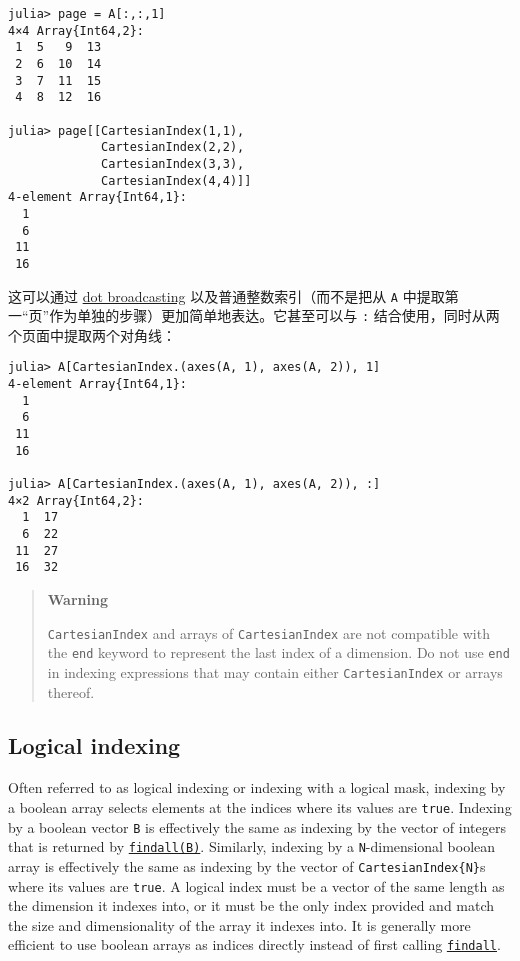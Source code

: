 \begin{verbatim}
julia> page = A[:,:,1]
4×4 Array{Int64,2}:
 1  5   9  13
 2  6  10  14
 3  7  11  15
 4  8  12  16

julia> page[[CartesianIndex(1,1),
             CartesianIndex(2,2),
             CartesianIndex(3,3),
             CartesianIndex(4,4)]]
4-element Array{Int64,1}:
  1
  6
 11
 16
\end{verbatim}



这可以通过 \hyperlink{17801130558550430478}{dot broadcasting} 以及普通整数索引（而不是把从 \texttt{A} 中提取第一“页”作为单独的步骤）更加简单地表达。它甚至可以与 \texttt{:} 结合使用，同时从两个页面中提取两个对角线：




\begin{verbatim}
julia> A[CartesianIndex.(axes(A, 1), axes(A, 2)), 1]
4-element Array{Int64,1}:
  1
  6
 11
 16

julia> A[CartesianIndex.(axes(A, 1), axes(A, 2)), :]
4×2 Array{Int64,2}:
  1  17
  6  22
 11  27
 16  32
\end{verbatim}



\begin{quote}
\textbf{Warning}

\texttt{CartesianIndex} and arrays of \texttt{CartesianIndex} are not compatible with the \texttt{end} keyword to represent the last index of a dimension. Do not use \texttt{end} in indexing expressions that may contain either \texttt{CartesianIndex} or arrays thereof.

\end{quote}


\hypertarget{5700513412579425383}{}


\subsection{Logical indexing}



Often referred to as logical indexing or indexing with a logical mask, indexing by a boolean array selects elements at the indices where its values are \texttt{true}. Indexing by a boolean vector \texttt{B} is effectively the same as indexing by the vector of integers that is returned by \hyperlink{16067208921941164599}{\texttt{findall(B)}}. Similarly, indexing by a \texttt{N}-dimensional boolean array is effectively the same as indexing by the vector of \texttt{CartesianIndex\{N\}}s where its values are \texttt{true}. A logical index must be a vector of the same length as the dimension it indexes into, or it must be the only index provided and match the size and dimensionality of the array it indexes into. It is generally more efficient to use boolean arrays as indices directly instead of first calling \hyperlink{16067208921941164599}{\texttt{findall}}.




